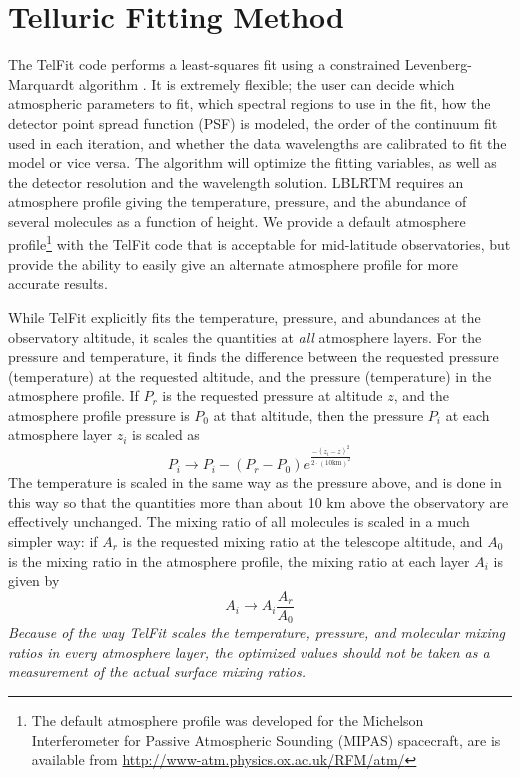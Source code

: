\section{Telluric Fitting Method}
\label{paper3_sec:tellcorr}

The TelFit code performs a least-squares fit using a constrained Levenberg-Marquardt algorithm \citep{Marquardt1963}. It is extremely flexible; the user can decide which atmospheric parameters to fit, which spectral regions to use in the fit, how the detector point spread function (PSF) is modeled, the order of the continuum fit used in each iteration, and whether the data wavelengths are calibrated to fit the model or vice versa. The algorithm will optimize the fitting variables, as well as the detector resolution and the wavelength solution. LBLRTM requires an atmosphere profile giving the temperature, pressure, and the abundance of several molecules as a function of height. We provide a default atmosphere profile\footnote{The default atmosphere profile was developed for the Michelson Interferometer for Passive Atmospheric Sounding (MIPAS) spacecraft, are is available from \url{http://www-atm.physics.ox.ac.uk/RFM/atm/}} with the TelFit code that is acceptable for mid-latitude observatories, but provide the ability to easily give an alternate atmosphere profile for more accurate results. 

While TelFit explicitly fits the temperature, pressure, and abundances at the observatory altitude, it scales the quantities at \emph{all} atmosphere layers. For the pressure and temperature, it finds the difference between the requested pressure (temperature) at the requested altitude, and the pressure (temperature) in the atmosphere profile. If $P_r$ is the requested pressure at altitude $z$, and the atmosphere profile pressure is $P_0 $ at that altitude, then the pressure $P_i $ at each atmosphere layer $z_i$ is scaled as
\begin{equation*}
  P_i \rightarrow P_i - (P_r - P_0) e^{\frac{-(z_i - z)^2}{2\cdot (10 \mathrm{km})^2}}
\end{equation*}
The temperature is scaled in the same way as the pressure above, and is done in this way so that the quantities more than about 10 km above the observatory are effectively unchanged. The mixing ratio of all molecules is scaled in a much simpler way: if $A_r$ is the requested mixing ratio at the telescope altitude, and $A_0$ is the mixing ratio in the atmosphere profile, the mixing ratio at each layer $A_i$ is given by
\begin{equation*}
  A_i \rightarrow A_i  \frac{A_r}{A_0}
\end{equation*}
\emph{Because of the way TelFit scales the temperature, pressure, and molecular mixing ratios in every atmosphere layer, the optimized values should not be taken as a measurement of the actual surface mixing ratios.}

